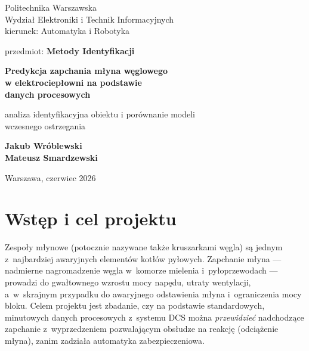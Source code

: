 \documentclass[11pt,a4paper]{article}
\title{}
\begin{document}
\begin{titlepage}
\centering
{\large Politechnika Warszawska\\
Wydział Elektroniki i Technik Informacyjnych\\
kierunek: Automatyka i Robotyka\par}
\vspace{1cm}
{\large przedmiot: \textbf{Metody Identyfikacji}\par}
\vfill
{\LARGE\bfseries Predykcja zapchania młyna węglowego\\[4pt]
w elektrociepłowni na podstawie\\[4pt]
danych procesowych\par}
\vspace{1.2cm}
{\large analiza identyfikacyjna obiektu i porównanie modeli\\
wczesnego ostrzegania\par}
\vfill
{\large\textbf{Jakub Wróblewski}\\[2pt]
\textbf{Mateusz Smardzewski}\par}
\vspace{1.5cm}
{\large Warszawa, czerwiec 2026\par}
\end{titlepage}

\tableofcontents
\newpage

\section{Wstęp i cel projektu}

Zespoły młynowe (potocznie nazywane także kruszarkami węgla) są jednym
z~najbardziej awaryjnych elementów kotłów pyłowych. Zapchanie młyna ---
nadmierne nagromadzenie węgla w~komorze mielenia i~pyłoprzewodach --- prowadzi
do gwałtownego wzrostu mocy napędu, utraty wentylacji, a~w~skrajnym przypadku
do awaryjnego odstawienia młyna i~ograniczenia mocy bloku. Celem projektu jest
zbadanie, czy na podstawie standardowych, minutowych danych procesowych
z~systemu DCS można \emph{przewidzieć} nadchodzące zapchanie z~wyprzedzeniem
pozwalającym obsłudze na reakcję (odciążenie młyna), zanim zadziała automatyka
zabezpieczeniowa.
\end{document}
